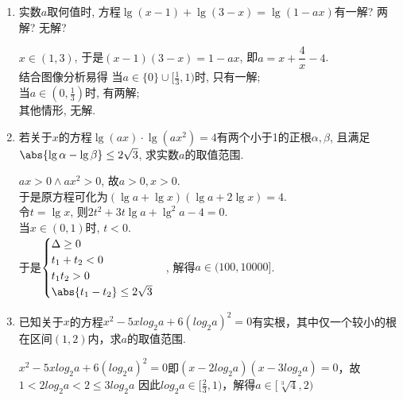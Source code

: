 \begin{enumerate}
    \item 实数$a$取何值时, 方程$\lg(x-1)+\lg(3-x)=\lg(1-ax)$有一解? 两解? 无解? 
    \begin{jieda}
    $x\in(1,3)$, 于是$(x-1)(3-x)=1-ax$, 即$a=x+\dfrac{4}{x}-4$. \\
    结合图像分析易得
    当$a\in\{0\}\cup[\frac{1}{3},1)$时, 只有一解; \\
    当$a\in(0,\frac{1}{3})$时, 有两解; \\
    其他情形, 无解. 
    \end{jieda}
    \begin{vspace_}
        \vsp[3]
    \end{vspace_}

    \item 若关于$x$的方程$\lg(ax)\cdot\lg(ax^2)=4$有两个小于1的正根$\alpha,\beta$, 
    且满足$\abs{\lg\alpha-\lg\beta}\leq 2\sqrt{3}$, 求实数$a$的取值范围. 
    \begin{jieda}
    $ax>0\land ax^2>0$, 故$a>0,x>0$. \\
    于是原方程可化为$(\lg{a}+\lg{x})(\lg{a}+2\lg{x})=4$. \\
    令$t=\lg{x}$, 则$2t^2+3t\lg{a}+\lg^2a-4=0$. \\
    当$x\in(0,1)$时, $t<0$. \\
    于是$\begin{cases}
    \Delta\geq 0\\
    t_1+t_2<0\\
    t_1t_2>0\\
    \abs{t_1-t_2}\leq 2\sqrt{3}
    \end{cases}$, 
    解得$a\in(100,10000]$. 
    \end{jieda}
    \begin{vspace_}
        \vsp[3]
    \end{vspace_}

    \item 已知关于$x$的方程$x^2-5xlog_2a+6(log_2a)^2 = 0$有实根，其中仅一个较小的根在区间$(1, 2)$内，求$a$的取值范围.
    \begin{jieda}
        $x^2-5xlog_2a+6(log_2a)^2 = 0$即$(x - 2log_2a)(x - 3log_2a) = 0$，故$1 < 2log_2a < 2 \leq 3log_2a$
        因此$log_2a \in [\frac{2}{3}, 1)$，解得$a \in [\sqrt[3]{4}, 2)$
    \end{jieda}
    \begin{vspace_}
        \vsp[3]
    \end{vspace_}


\end{enumerate}
